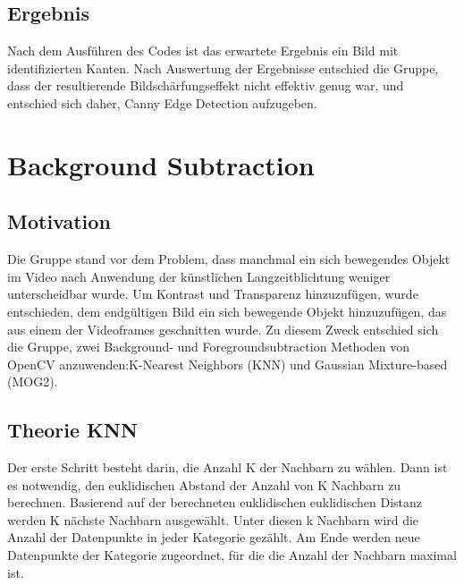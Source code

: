 \documentclass[12pt]{scrartcl}
\begin{document}
\subsection{Ergebnis}
Nach dem Ausf\"uhren des Codes ist das erwartete Ergebnis ein Bild mit identifizierten Kanten. Nach Auswertung der Ergebnisse entschied die Gruppe, dass der resultierende Bildsch\"arfungseffekt nicht effektiv genug war, und entschied sich daher, Canny Edge Detection aufzugeben.\\
\section{Background Subtraction}
\subsection{Motivation}
Die Gruppe stand vor dem Problem, dass manchmal ein sich bewegendes Objekt im Video nach Anwendung der k\"unstlichen Langzeitblichtung weniger unterscheidbar wurde. Um Kontrast und Transparenz hinzuzuf\"ugen, wurde entschieden, dem endg\"ultigen Bild ein sich bewegende Objekt hinzuzuf\"ugen, das aus einem der Videoframes geschnitten wurde.
Zu diesem Zweck entschied sich die Gruppe, zwei Background- und Foregroundsubtraction Methoden von OpenCV anzuwenden:K-Nearest Neighbors (KNN) und Gaussian Mixture-based (MOG2).\\
\subsection{Theorie KNN}
Der erste Schritt besteht darin, die Anzahl K der Nachbarn zu w\"ahlen. Dann ist es notwendig, den euklidischen Abstand der Anzahl von K Nachbarn zu berechnen. Basierend auf der berechneten euklidischen euklidischen Distanz werden K n\"achste Nachbarn ausgew\"ahlt. Unter diesen k Nachbarn wird die Anzahl der Datenpunkte in jeder Kategorie gez\"ahlt.
Am Ende werden neue Datenpunkte der Kategorie zugeordnet, f\"ur die die Anzahl der Nachbarn maximal ist.
\end{document}
